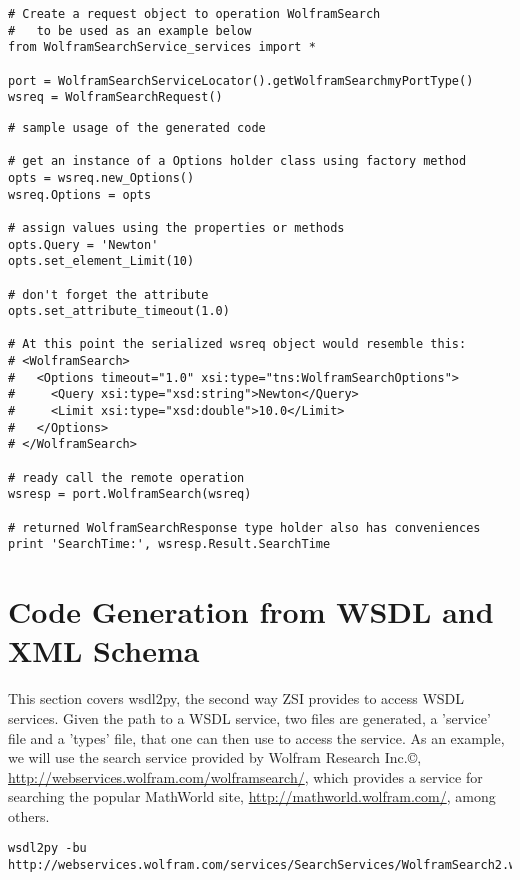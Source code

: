 \begin{verbatim}
# Create a request object to operation WolframSearch
#   to be used as an example below
from WolframSearchService_services import *

port = WolframSearchServiceLocator().getWolframSearchmyPortType()
wsreq = WolframSearchRequest()
\end{verbatim}



\begin{verbatim}
# sample usage of the generated code

# get an instance of a Options holder class using factory method
opts = wsreq.new_Options()
wsreq.Options = opts

# assign values using the properties or methods
opts.Query = 'Newton'
opts.set_element_Limit(10)

# don't forget the attribute
opts.set_attribute_timeout(1.0)

# At this point the serialized wsreq object would resemble this:
# <WolframSearch>
#   <Options timeout="1.0" xsi:type="tns:WolframSearchOptions">
#     <Query xsi:type="xsd:string">Newton</Query>
#     <Limit xsi:type="xsd:double">10.0</Limit>
#   </Options>
# </WolframSearch>

# ready call the remote operation
wsresp = port.WolframSearch(wsreq)

# returned WolframSearchResponse type holder also has conveniences
print 'SearchTime:', wsresp.Result.SearchTime
\end{verbatim}

\section{Code Generation from WSDL and XML Schema}

This section covers wsdl2py, the second way ZSI provides to access WSDL
services.  Given the path to a WSDL service, two files are generated, a 
'service' file and a 'types' file, that one can then use to access the
service.  As an example, we will use the search service provided by Wolfram
Research Inc.\copyright{}, \url{http://webservices.wolfram.com/wolframsearch/}, 
which provides a service for searching the popular MathWorld site, 
\url{http://mathworld.wolfram.com/}, among others.

\begin{verbatim}
wsdl2py -bu http://webservices.wolfram.com/services/SearchServices/WolframSearch2.wsdl
\end{verbatim}

